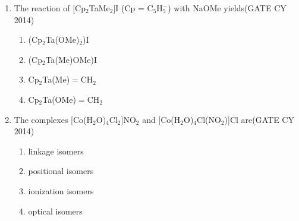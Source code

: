 \documentclass[a4paper,10pt]{exam}
\theoremstyle{remark}
\begin{document}
\begin{enumerate}
    \item The reaction of [Cp$_2$TaMe$_2$]I (Cp = C$_5$H$_5^{-}$) with NaOMe yields\hfill{(GATE CY 2014)}
    \begin{multicols}{2}
    \begin{enumerate} 
        \item (Cp$_2$Ta(OMe)$_2$)I
        \item (Cp$_2$Ta(Me)OMe)I
        \item Cp$_2$Ta(Me)$=$CH$_2$
        \item Cp$_2$Ta(OMe)$=$CH$_2$
    \end{enumerate}
    \end{multicols}

    \item The complexes [Co(H$_2$O)$_4$Cl$_2$]NO$_2$ and [Co(H$_2$O)$_4$Cl(NO$_2$)]Cl are\hfill{(GATE CY 2014)}
    \begin{multicols}{2}
    \begin{enumerate} 
        \item linkage isomers
        \item positional isomers
        \item ionization isomers
        \item optical isomers
    \end{enumerate}
    \end{multicols}


\end{enumerate}
\end{document}
